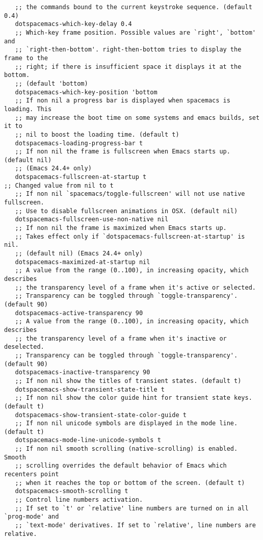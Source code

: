 \documentclass[11pt]{article}
\begin{document}
\begin{verbatim}
   ;; the commands bound to the current keystroke sequence. (default 0.4)
   dotspacemacs-which-key-delay 0.4
   ;; Which-key frame position. Possible values are `right', `bottom' and
   ;; `right-then-bottom'. right-then-bottom tries to display the frame to the
   ;; right; if there is insufficient space it displays it at the bottom.
   ;; (default 'bottom)
   dotspacemacs-which-key-position 'bottom
   ;; If non nil a progress bar is displayed when spacemacs is loading. This
   ;; may increase the boot time on some systems and emacs builds, set it to
   ;; nil to boost the loading time. (default t)
   dotspacemacs-loading-progress-bar t
   ;; If non nil the frame is fullscreen when Emacs starts up. (default nil)
   ;; (Emacs 24.4+ only)
   dotspacemacs-fullscreen-at-startup t                                                                   ;; Changed value from nil to t
   ;; If non nil `spacemacs/toggle-fullscreen' will not use native fullscreen.
   ;; Use to disable fullscreen animations in OSX. (default nil)
   dotspacemacs-fullscreen-use-non-native nil
   ;; If non nil the frame is maximized when Emacs starts up.
   ;; Takes effect only if `dotspacemacs-fullscreen-at-startup' is nil.
   ;; (default nil) (Emacs 24.4+ only)
   dotspacemacs-maximized-at-startup nil
   ;; A value from the range (0..100), in increasing opacity, which describes
   ;; the transparency level of a frame when it's active or selected.
   ;; Transparency can be toggled through `toggle-transparency'. (default 90)
   dotspacemacs-active-transparency 90
   ;; A value from the range (0..100), in increasing opacity, which describes
   ;; the transparency level of a frame when it's inactive or deselected.
   ;; Transparency can be toggled through `toggle-transparency'. (default 90)
   dotspacemacs-inactive-transparency 90
   ;; If non nil show the titles of transient states. (default t)
   dotspacemacs-show-transient-state-title t
   ;; If non nil show the color guide hint for transient state keys. (default t)
   dotspacemacs-show-transient-state-color-guide t
   ;; If non nil unicode symbols are displayed in the mode line. (default t)
   dotspacemacs-mode-line-unicode-symbols t
   ;; If non nil smooth scrolling (native-scrolling) is enabled. Smooth
   ;; scrolling overrides the default behavior of Emacs which recenters point
   ;; when it reaches the top or bottom of the screen. (default t)
   dotspacemacs-smooth-scrolling t
   ;; Control line numbers activation.
   ;; If set to `t' or `relative' line numbers are turned on in all `prog-mode' and
   ;; `text-mode' derivatives. If set to `relative', line numbers are relative.

\end{verbatim}
\end{document}
